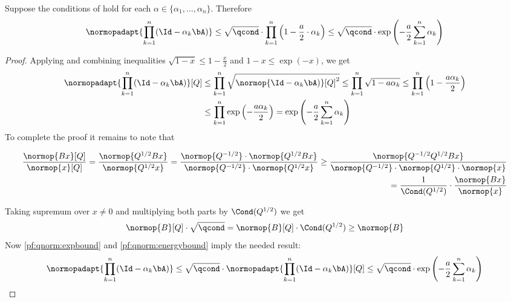 \begin{proposition}
\label{cor:hurwitz_stability}
    Suppose the conditions of {} hold for each $\alpha \in \{\alpha_1, \ldots, \alpha_n\}$. Therefore
    \begin{equation}
        \label{bound:id_minus_aA}
        \normopadapt{\prod_{k=1}^n (\Id - \alpha_k \bA)} \leq \sqrt{\qcond} \cdot \prod_{k=1}^n \left(1 -\frac{a}{2} \cdot \alpha_k\right) \leq \sqrt{\qcond} \cdot \exp{\left(-\frac{a}{2} \sum_{k=1}^n \alpha_k\right)}
    \end{equation}
\end{proposition}

\begin{proof}
    Applying \textbf{} and combining inequalities $\sqrt{1 - x} \leq 1 - \frac{x}{2}$ and $1 - x \leq \exp(-x)$, we get
    \begin{align}
    \label{pf:qnorm:expbound}
    \normopadapt{\prod_{k=1}^n (\Id - \alpha_k \bA)}[Q] 
    &\leq \prod_{k=1}^n \sqrt{\normop{\Id - \alpha_k \bA)}[Q]^2} \leq \prod_{k=1}^n \sqrt{1 - a \alpha_k} \leq \prod_{k=1}^n \left(1 - \frac{a \alpha_k}{2}\right) \\ 
    &\leq \prod_{k=1}^n \exp\left(-\frac{a \alpha_k}{2}\right) = \exp\left(- \frac{a}{2}\sum_{k=1}^n \alpha_k\right)
    \end{align}
    To complete the proof it remains to note that
    
    \begin{align}
        \frac{\normop{B x}[Q]}{\normop{x}[Q]} = \frac{\normop{Q^{1/2} B x}}{\normop{Q^{1/2} x}} = \frac{\normop{Q^{-1/2}} \cdot \normop{Q^{1/2} B x}}{\normop{Q^{-1/2}} \cdot \normop{Q^{1/2} x}} \geq \frac{\normop{Q^{-1/2} Q^{1/2} B x}}{ \normop{Q^{-1/2}} \cdot \normop{Q^{1/2}} \cdot \normop{x}} \\ = \frac{1}{\Cond(Q^{1/2})} \cdot \frac{\normop{B x}}{\normop{x}}
    \end{align}
    
    Taking supremum over $x \ne 0$ and multiplying both parts by $\Cond(Q^{1/2})$ we get 
    \begin{equation}
        \label{pf:qnorm:energybound}
         \normop{B}[Q] \cdot \sqrt{\qcond} = \normop{B}[Q] \cdot \Cond(Q^{1/2}) \geq \normop{B}
    \end{equation}
    Now \eqref{pf:qnorm:expbound} and \eqref{pf:qnorm:energybound} imply the needed result:
    \begin{equation}
        \normopadapt{\prod_{k=1}^n (\Id - \alpha_k \bA)} \leq \sqrt{\qcond} \cdot \normopadapt{\prod_{k=1}^n (\Id - \alpha_k \bA)}[Q] \leq \sqrt{\qcond} \cdot \exp\left(- \frac{a}{2}\sum_{k=1}^n \alpha_k\right)
    \end{equation}
\end{proof}


